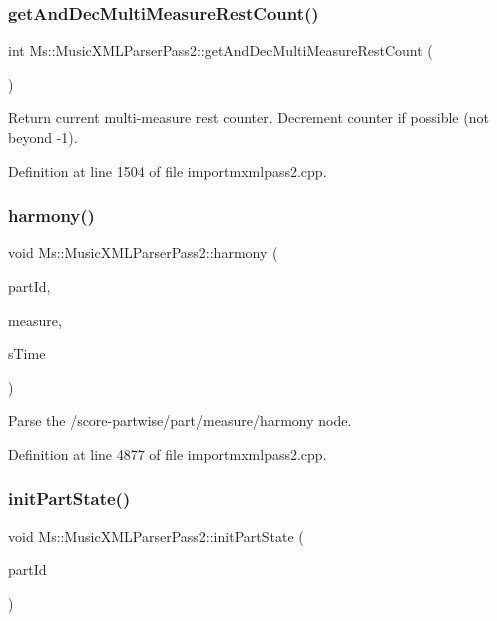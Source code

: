 \subsubsection{\texorpdfstring{get\+And\+Dec\+Multi\+Measure\+Rest\+Count()}{getAndDecMultiMeasureRestCount()}}
{\footnotesize\ttfamily int Ms\+::\+Music\+X\+M\+L\+Parser\+Pass2\+::get\+And\+Dec\+Multi\+Measure\+Rest\+Count (\begin{DoxyParamCaption}{ }\end{DoxyParamCaption})}

Return current multi-\/measure rest counter. Decrement counter if possible (not beyond -\/1). 

Definition at line 1504 of file importmxmlpass2.\+cpp.

\mbox{\label{class_ms_1_1_music_x_m_l_parser_pass2_aa6a09ee401d5ac7e335649f3c3266e42}} 
\subsubsection{\texorpdfstring{harmony()}{harmony()}}
{\footnotesize\ttfamily void Ms\+::\+Music\+X\+M\+L\+Parser\+Pass2\+::harmony (\begin{DoxyParamCaption}\item[{const Q\+String \&}]{part\+Id,  }\item[{\hyperlink{class_ms_1_1_measure}{Measure} $\ast$}]{measure,  }\item[{const \hyperlink{class_ms_1_1_fraction}{Fraction}}]{s\+Time }\end{DoxyParamCaption})}

Parse the /score-\/partwise/part/measure/harmony node. 

Definition at line 4877 of file importmxmlpass2.\+cpp.

\mbox{\label{class_ms_1_1_music_x_m_l_parser_pass2_a3c2d4ccceaad560493c5aa8d33bf8946}} 
\subsubsection{\texorpdfstring{init\+Part\+State()}{initPartState()}}
{\footnotesize\ttfamily void Ms\+::\+Music\+X\+M\+L\+Parser\+Pass2\+::init\+Part\+State (\begin{DoxyParamCaption}\item[{const Q\+String \&}]{part\+Id }\end{DoxyParamCaption})}

